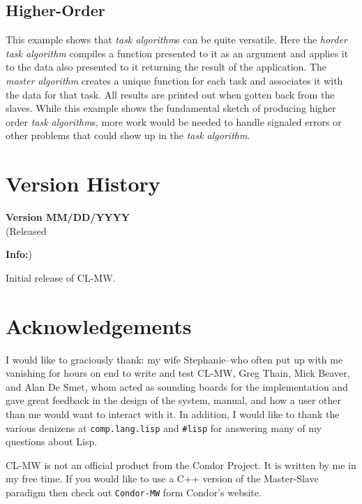 \documentclass[titlepage,12pt]{book}
\newcommand{\xsmall}{\latexhtml{\small}{}}
\newcommand{\xnormalsize}{\latexhtml{\normalsize}{}}
\newcommand{\mw}{Master-Slave\xspace}
\newcommand{\clmw}{\xsmall\textsc{CL-MW}\xnormalsize\xspace}
\newcommand{\ma}{\textit{master algorithm}\xspace}
\newcommand{\ta}{\textit{task algorithm}\xspace}
\newcommand{\tas}{\textit{task algorithm}s\xspace}
\newcommand{\bold}[1]{\textbf{#1}\xspace}
\newenvironment{verhist}[2]
	{\textbf{Version #1}\\\indent\xsmall(Released #2)\xnormalsize
	 \begin{itemize}}
	{\end{itemize}}
\newcommand{\info}{\item \bold{Info:}\xspace}
\begin{document}
\section{Higher-Order}
This example shows that \tas can be quite versatile. Here the
\textit{horder} \ta compiles a function presented to it as an argument
and applies it to the data also presented to it returning the result
of the application. The \ma creates a unique function for each task
and associates it with the data for that task. All results are printed
out when gotten back from the slaves. While this example shows the
fundamental sketch of producing higher order \tas, more work would
be needed to handle signaled errors or other problems that could show
up in the \ta.

\chapter{\label{version-history}Version History}

\begin{verhist}{0.1}{MM/DD/YYYY}
\info Initial release of \clmw.
\end{verhist}

\chapter{Acknowledgements}

I would like to graciously thank: my wife Stephanie--who often put
up with me vanishing for hours on end to write and test \clmw, Greg
Thain, Mick Beaver, and Alan De Smet, whom acted as sounding boards
for the implementation and gave great feedback in the design of the
system, manual, and how a user other than me would want to interact
with it. In addition, I would like to thank the various denizens at
\texttt{comp.lang.lisp} and \texttt{\#lisp} for answering many of my
questions about Lisp.

\clmw is not an official product from the Condor Project. It is written
by me in my free time. If you would like to use a C++ version of the
\mw paradigm then check out \texttt{Condor-MW} form Condor's website.

\backmatter
\end{document}
